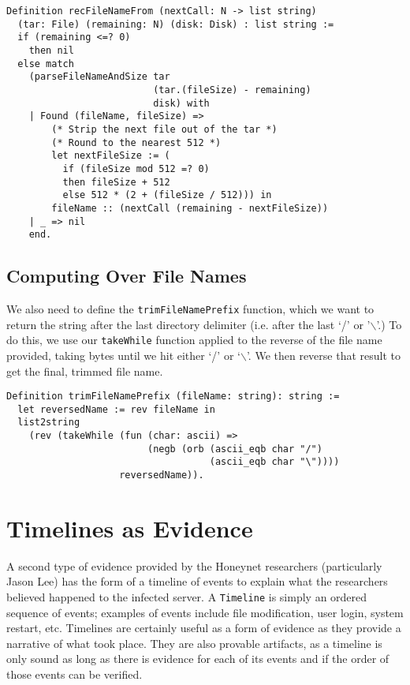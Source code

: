 \documentclass[nocopyrightspace,preprint]{sigplanconf}
\begin{document}
\begin{lstlisting}
Definition recFileNameFrom (nextCall: N -> list string) 
  (tar: File) (remaining: N) (disk: Disk) : list string :=
  if (remaining <=? 0)
    then nil
  else match 
    (parseFileNameAndSize tar 
                          (tar.(fileSize) - remaining) 
                          disk) with
    | Found (fileName, fileSize) =>
        (* Strip the next file out of the tar *)
        (* Round to the nearest 512 *)
        let nextFileSize := (
          if (fileSize mod 512 =? 0)
          then fileSize + 512
          else 512 * (2 + (fileSize / 512))) in
        fileName :: (nextCall (remaining - nextFileSize))
    | _ => nil
    end.
\end{lstlisting}

\subsection{Computing Over File Names}

We also need to define the {\tt trimFileNamePrefix} function, which we want to
return the string after the last directory delimiter (i.e. after the last `/'
or '$\backslash$'.) To do this, we use our {\tt takeWhile} function applied
to the reverse of the file name provided, taking bytes until we hit either `/'
or `$\backslash$'. We then reverse that result to get the final, trimmed file
name.

\begin{lstlisting}
Definition trimFileNamePrefix (fileName: string): string :=
  let reversedName := rev fileName in
  list2string
    (rev (takeWhile (fun (char: ascii) => 
                         (negb (orb (ascii_eqb char "/")
                                    (ascii_eqb char "\"))))
                    reversedName)).
\end{lstlisting}

\section{Timelines as Evidence}
\label{sec:timelines}

A second type of evidence provided by the Honeynet researchers (particularly
Jason Lee\cite{lee}) has the form of a timeline of events to explain what the
researchers believed happened to the infected server. A {\tt Timeline} is
simply an ordered sequence of events; examples of events include file
modification, user login, system restart, etc. Timelines are certainly useful
as a form of evidence as they provide a narrative of what took place. They are
also provable artifacts, as a timeline is only sound as long as there is
evidence for each of its events and if the order of those events can be
verified. 
\end{document}

